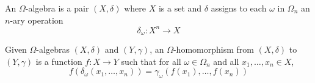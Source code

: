 An $\Omega$-algebra is a pair $(X, \delta)$ where $X$ is a set and $\delta$ assigns to each $\omega$ in $\Omega_n$ an $n$-ary operation
$$\delta_\omega : X^n \longrightarrow X$$

Given $\Omega$-algebras $(X, \delta)$ and $(Y, \gamma)$, an $\Omega$-homomorphism from $(X, \delta)$ to $(Y, \gamma)$ is a function $f: X \longrightarrow Y$ such that for all $\omega \in \Omega_n$ and all $x_1, \ldots, x_n \in X$,
$$f(\delta_\omega(x_1, \ldots, x_n)) = \gamma_\omega(f(x_1), \ldots, f(x_n))$$
